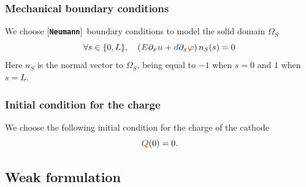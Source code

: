 \documentclass[11pt,a4paper]{article}
\newcommand{\unknown}[1]{\bm{{\color{myred}{#1}}}}
\newcommand{\param}[1]{\bm{{\color{myhyperblue}{#1}}}}
\newcommand{\keyword}[1]{[\texttt{\textbf{#1}}]\!\,}
\begin{document}
\subsubsection{Mechanical boundary conditions}

We choose \keyword{Neumann} boundary conditions to model the solid domain $\Omega_S$
\begin{equation*}
\forall s \in\{0, L\}, \quad \left( \param{E} \partial_x \unknown{u} +  \param{d} \partial_x \unknown{\varphi} \right) n_S(s) = 0 
\end{equation*}
Here $n_S$ is the normal vector to $\Omega_S$, being equal to $-1$ when $s = 0$ and $1$ when $s=L$.

\subsubsection{Initial condition for the charge}

We choose the following initial condition for the charge of the cathode
\begin{equation*}
\unknown{Q}(0) = 0.
\end{equation*}

\subsection{Weak formulation}
\end{document}
